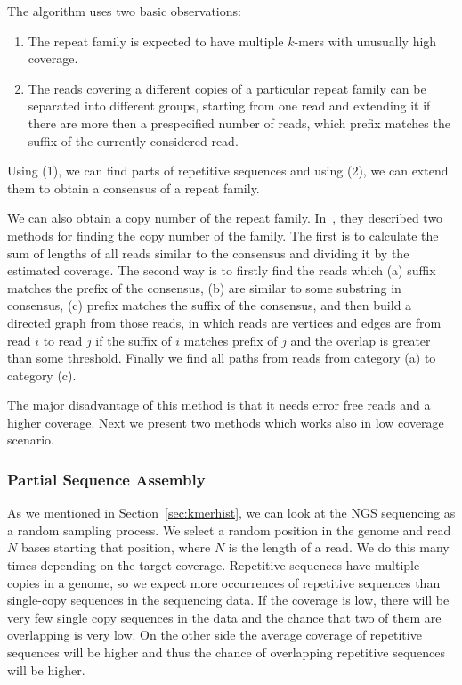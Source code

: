The algorithm uses two basic observations:

\begin{enumerate}
  \item The repeat family is expected to have multiple $k$-mers with  unusually high coverage.
  \item The reads covering a different copies of a particular repeat family can be separated into different groups, starting from one read and extending it if there are more then a prespecified number of reads, which prefix matches the suffix of the currently considered read.
\end{enumerate}

Using (1), we can find parts of repetitive sequences and using (2), we can extend them to obtain a consensus of a repeat family.

We can also obtain a copy number of the repeat family. In~\cite{waterman}, they described two methods for finding the copy number of the family.
The first is to calculate the sum of lengths of all reads similar to the consensus and dividing it by the estimated coverage.
The second way is to firstly find the reads which (a) suffix matches the prefix of the consensus, (b) are similar to some substring in consensus, (c) prefix matches the suffix of the consensus, and then build a directed graph from those reads, in which reads are vertices and edges are from read $i$ to read $j$ if the suffix of $i$ matches prefix of $j$ and the overlap is greater than some threshold. Finally we find all paths from reads from category (a) to category (c).

The major disadvantage of this method is that it needs error free reads and a higher coverage.
Next we present two methods which works also in low coverage scenario.

\subsubsection{Partial Sequence Assembly}

As we mentioned in Section~\ref{sec:kmerhist}, we can look at the NGS sequencing as a random sampling process. We select a random position in the genome and read $N$ bases starting that position, where $N$ is the length of a read. We do this many times depending on the target coverage.
Repetitive sequences have multiple copies in a genome, so we expect more occurrences of repetitive sequences than single-copy sequences in the sequencing data. If the coverage is low, there will be very few single copy sequences in the data and the chance that two of them are overlapping is very low. On the other side the average coverage of repetitive sequences will be higher and thus the chance of overlapping repetitive sequences will be higher.

